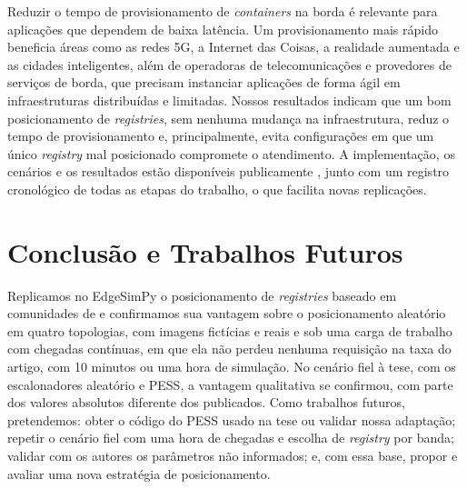 \documentclass[12pt]{article}
\begin{document}
Reduzir o tempo de provisionamento de \textit{containers} na borda é relevante
para aplicações que dependem de baixa latência. Um provisionamento mais rápido
beneficia áreas como as redes 5G, a Internet das Coisas, a realidade aumentada e
as cidades inteligentes, além de operadoras de telecomunicações e provedores de
serviços de borda, que precisam instanciar aplicações de forma ágil em
infraestruturas distribuídas e limitadas. Nossos resultados indicam que um bom
posicionamento de \textit{registries}, sem nenhuma mudança na infraestrutura,
reduz o tempo de provisionamento e, principalmente, evita configurações em que um
único \textit{registry} mal posicionado compromete o atendimento. A
implementação, os cenários e os resultados estão disponíveis publicamente
\cite{repositorio}, junto com um registro cronológico de todas as etapas do
trabalho, o que facilita novas replicações.

\section{Conclusão e Trabalhos Futuros}
\label{sec:conclusao}

Replicamos no EdgeSimPy o posicionamento de \textit{registries} baseado em
comunidades de \cite{knob2021} e confirmamos sua vantagem sobre o posicionamento
aleatório em quatro topologias, com imagens fictícias e reais e sob uma carga de
trabalho com chegadas contínuas, em que ela não perdeu nenhuma requisição na taxa
do artigo, com 10 minutos ou uma hora de simulação. No cenário fiel à tese, com os
escalonadores aleatório e PESS, a vantagem qualitativa se confirmou, com parte dos
valores absolutos diferente dos publicados. Como trabalhos futuros, pretendemos:
obter o código do PESS usado na tese ou validar nossa adaptação; repetir o
cenário fiel com uma hora de chegadas e escolha de \textit{registry} por banda;
validar com os autores os parâmetros não informados; e, com essa base, propor e
avaliar uma nova estratégia de posicionamento.



\end{document}
